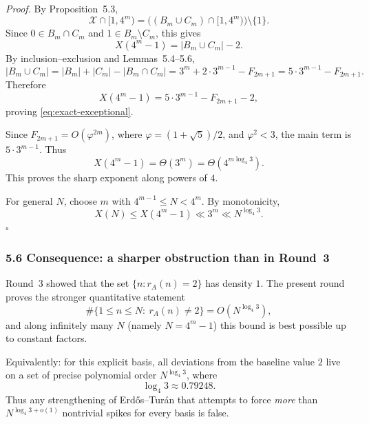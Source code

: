\medskip
\noindent
\emph{Proof.}
By Proposition~5.3,
\[
\mathcal X\cap[1,4^m)=\bigl((B_m\cup C_m)\cap[1,4^m)\bigr)\setminus\{1\}.
\]
Since \(0\in B_m\cap C_m\) and \(1\in B_m\setminus C_m\), this gives
\[
X(4^m-1)=|B_m\cup C_m|-2.
\]
By inclusion--exclusion and Lemmas~5.4--5.6,
\[
|B_m\cup C_m|
=
|B_m|+|C_m|-|B_m\cap C_m|
=
3^m+2\cdot 3^{m-1}-F_{2m+1}
=
5\cdot 3^{m-1}-F_{2m+1}.
\]
Therefore
\[
X(4^m-1)=5\cdot 3^{m-1}-F_{2m+1}-2,
\]
proving \eqref{eq:exact-exceptional}.

Since \(F_{2m+1}=O(\varphi^{2m})\), where \(\varphi=(1+\sqrt5)/2\), and \(\varphi^2<3\), the main term is \(5\cdot 3^{m-1}\). Thus
\[
X(4^m-1)=\Theta(3^m)=\Theta(4^{m\log_4 3}).
\]
This proves the sharp exponent along powers of \(4\).

For general \(N\), choose \(m\) with \(4^{m-1}\le N<4^m\). By monotonicity,
\[
X(N)\le X(4^m-1)\ll 3^m\ll N^{\log_4 3}.
\]
\hfill\(\square\)

\subsubsection*{5.6 Consequence: a sharper obstruction than in Round~3}
Round~3 showed that the set \(\{n:r_A(n)=2\}\) has density \(1\). The present round proves the stronger quantitative statement
\[
\#\{1\le n\le N:\ r_A(n)\ne 2\}=O(N^{\log_4 3}),
\]
and along infinitely many \(N\) (namely \(N=4^m-1\)) this bound is best possible up to constant factors.

Equivalently: for this explicit basis, all deviations from the baseline value \(2\) live on a set of precise polynomial order \(N^{\log_4 3}\), where
\[
\log_4 3\approx 0.79248.
\]
Thus any strengthening of Erd\H{o}s--Tur\'an that attempts to force \emph{more} than \(N^{\log_4 3+o(1)}\) nontrivial spikes for every basis is false.

